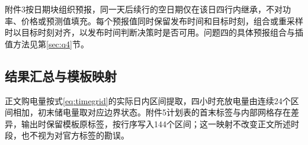 附件3按日期块组织预报，同一天后续行的空日期仅在该日四行内继承，不对功率、价格或预测值填充。每个预报值同时保留发布时间和目标时刻，组合或重采样时以目标时刻对齐，以发布时间判断决策时是否可用。问题四的具体预报组合与插值方法见第\ref{sec:q4}节。

\subsection{结果汇总与模板映射}
正文购电量按式\eqref{eq:timegrid}的实际日内区间提取，四小时充放电量由连续24个区间相加，初末储电量取对应边界状态。附件5计划表的首末标签与内部网格存在差异，输出时保留模板原标签，按行序写入144个区间；这一映射不改变正文所述时段，也不视为对官方标签的勘误。

